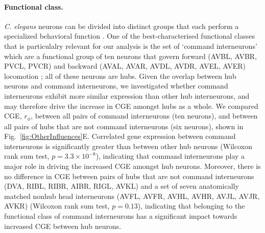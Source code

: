 \documentclass[10pt,letterpaper]{article}
\begin{document}
{\paragraph{Functional class.}
\emph{C. elegans} neurons can be divided into distinct groups that each perform a specialized behavioral function \cite{Hobert2003}.
One of the best-characterised functional classes that is particulalry relevant for our analysis is the set of `command interneurons' which are a functional group of ten neurons that govern forward (AVBL, AVBR, PVCL, PVCR) and backward (AVAL, AVAR, AVDL, AVDR, AVEL, AVER) locomotion \cite{Rakowski2013}; all of these neurons are hubs.
Given the overlap between hub neurons and command interneurons, we investigated whether command interneurons exhibit more similar expression than other hub interneurons, and may therefore drive the increase in CGE amongst hubs as a whole.
We compared CGE, $r_\phi$, between all pairs of command interneurons (ten neurons), and between all pairs of hubs that are not command interneurons (six neurons), shown in Fig.~\ref{fig:OtherInfluences}E.
Correlated gene expression between command interneurons is significantly greater than between other hub neurons (Wilcoxon rank sum test, $p = 3.3 \times 10^{-8}$), indicating that command interneurons play a major role in driving the increased CGE amongst hub neurons.
Moreover, there is no difference in CGE between pairs of hubs that are not command interneurons (DVA, RIBL, RIBR, AIBR, RIGL, AVKL) and a set of seven anatomically matched nonhub head interneurons (AVFL, AVFR, AVHL, AVHR, AVJL, AVJR, AVKR) (Wilcoxon rank sum test, $p = 0.13$), indicating that belonging to the functional class of command interneurons has a significant impact towards increased CGE between hub neurons.



}
\end{document}
